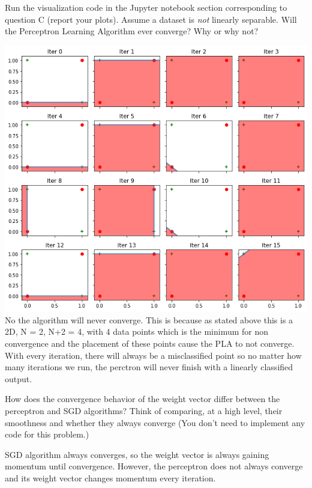 \begin{problem}[2]
  Run the visualization code in the Jupyter notebook section corresponding to question C (report your plots). Assume a dataset is \emph{not} linearly separable. Will the Perceptron Learning Algorithm ever converge? Why or why not?
\end{problem}
\begin{solution}
\includegraphics[scale=.5]{set1/images/PerceptVisNSH1.png}\newline
No the algorithm will never converge. This is because as stated above this is a 2D, N = 2, N+2 = 4, with 4 data points which is the minimum for non convergence and the placement of these points cause the PLA to not converge. With every iteration, there will always be a misclassified point so no matter how many iterations we run, the perctron will never finish with a linearly classified output. 
\end{solution}

\begin{problem}[2]
How does the convergence behavior of the weight vector differ between the perceptron and SGD algorithms? Think of comparing, at a high level, their smoothness and whether they always converge (You don't need to implement any code for this problem.)
\end{problem}
\begin{solution}
SGD algorithm always converges, so the weight vector is always gaining momentum until convergence. However, the perceptron does not always converge and its weight vector changes momentum every iteration.

\end{solution}

